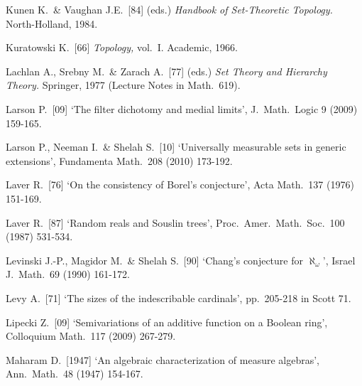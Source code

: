 {Kunen K.\ \& Vaughan J.E.\ [84] (eds.) {\it Handbook of Set-Theoretic
Topology.}   North-Holland, 1984.

Kuratowski K.\ [66] {\it Topology,} vol.\ I.   Academic, 1966.
\cmmnt{[562G.]}

\medskip%

Lachlan A., Srebny M.\ \& Zarach A.\ [77] (eds.) {\it Set Theory and Hierarchy Theory.}  Springer, 1977 (Lecture Notes in Math.\ 619).


Larson P.\ [09] `The filter dichotomy and medial limits',
J.\ Math.\ Logic 9 (2009) 159-165.
\cmmnt{[538S.]}

Larson P., Neeman I.\ \& Shelah S.\ [10] `Universally measurable sets in
generic extensions', Fundamenta Math.\ 208 (2010) 173-192.
\cmmnt{[553O.]}
	

Laver R.\ [76] `On the consistency of Borel's conjecture', Acta Math.\
137 (1976) 151-169.
\cmmnt{[534Q.]}

Laver R.\ [87] `Random reals and Souslin trees',
Proc.\ Amer.\ Math.\ Soc.\ 100 (1987) 531-534.
\cmmnt{[553M.]}

Levinski J.-P., Magidor M.\ \& Shelah S.\ [90] `Chang's conjecture for
$\aleph_{\omega}$', Israel J.\ Math.\ 69 (1990) 161-172.
\cmmnt{[5A6F.]}

Levy A.\ [71] `The sizes of the indescribable cardinals',
pp.\ 205-218 in {\smc Scott 71}.

Lipecki Z.\ [09]
`Semivariations of an additive function on a Boolean ring',
Colloquium Math.\ 117 (2009) 267-279.
\cmmnt{[552Xe.]}




\medskip%

Maharam D.\ [1947] `An algebraic characterization of measure algebras',
Ann.\ Math.\ 48 (1947) 154-167.
\cmmnt{[539P.]}

}
